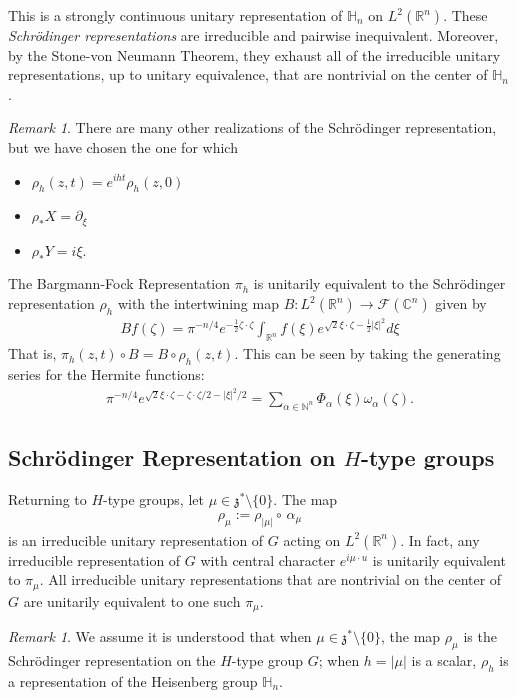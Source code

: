 \documentclass[11pt]{amsart}
\theoremstyle{plain}
\theoremstyle{definition}
\theoremstyle{remark}
\newtheorem{remark}[theorem]{Remark}
\numberwithin{equation}{section}
\def\fz{\mathfrak{z}}
\def\cF{\mathcal{F}}
\def\mz{\setminus\{0\}}
\def\R{{\mathbb R}}%
\def\C{{\mathbb C}}%
\def\N{{\mathbb N}}%
\def \heis {\mathbb{H}}
\numberwithin{equation}{section}
\begin{document}
This is a strongly continuous unitary representation of $\mathbb{H}_n$ on $L^2(\mathbb{R}^n)$.  These \textit{Schr\"{o}dinger representations} are irreducible and pairwise inequivalent. Moreover, by the Stone-von Neumann Theorem, they exhaust all of the irreducible unitary representations, up to unitary equivalence, that are nontrivial on the center of $\mathbb{H}_n$.

\begin{remark}
	There are many other realizations of the Schr\"{o}dinger representation, but we have chosen the one for which
	\begin{itemize}
		\item $\rho_h(z, t)=e^{iht}\rho_h(z, 0)$
		\item $\rho_*X=\partial_\xi$
		\item $\rho_*Y=i\xi$. 
	\end{itemize}
\end{remark}
The Bargmann-Fock Representation ${\pi}_h$ is unitarily equivalent to the Schr\"{o}dinger representation $\rho_{ h}$ with the intertwining map $B: L^2(\R^n)\to \cF(\C^n)$ given by
\begin{align}\label{Bargmann}
	Bf(\zeta)=\pi^{-n/4}e^{-\frac{1}{2}\zeta\cdot\zeta}\int_{\R^n}f(\xi)e^{\sqrt{2}\xi\cdot\zeta -\frac{1}{2}|\xi|^2}d\xi
\end{align}
That is, $\pi_h(z, t)\circ B=B\circ\rho_h(z, t).$ This can be seen by taking the generating series for the Hermite functions:
\begin{align*}
	\pi^{-n/4}e^{\sqrt{2}\xi\cdot\zeta-\zeta\cdot\zeta/2-|\xi|^2/2}=\sum_{\alpha\in \N^n}\Phi_\alpha(\xi)\omega_\alpha(\zeta).
\end{align*}
\subsection{Schr\"{o}dinger  Representation on $H$-type groups}
Returning to $H$-type groups, let $\mu\in \fz^*\setminus\{0\}$. 
The map
\begin{align*}
	\rho_\mu:=\rho_{|\mu|}{\circ}\,\alpha_\mu
\end{align*}
is an irreducible unitary representation of $G$ acting on $L^2(\mathbb{R}^n)$. In fact, any irreducible representation of $G$ with central character $e^{i\mu\cdot u}$ is unitarily equivalent to $\pi_\mu$. All irreducible unitary representations that are nontrivial on the center of $G$ are unitarily equivalent to one such $\pi_\mu$.
\begin{remark}
	We assume it is understood that when $\mu\in \fz^*\mz$, the map $\rho_\mu$ is the Schr\"{o}dinger representation on the $H$-type group $G$; when $h=|\mu|$ is a scalar, $\rho_h$ is a representation of the Heisenberg group $\heis_n$. 
\end{remark}
\end{document}
